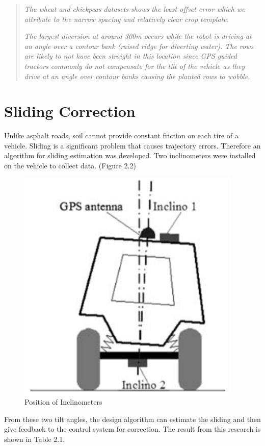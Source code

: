 \documentclass[letterpaper,12pt,oneside]{book}
\begin{document}
		\begin{quote}
			\textit{The wheat and chickpeas datasets shows the least offset error which we attribute to the narrow spacing and relatively clear crop template.}
				
			\textit{The largest diversion at around 300m occurs while the robot is driving at an angle over a contour bank (raised ridge for diverting water). The rows are likely to not have been straight in this location since GPS guided tractors commonly do not compensate for the tilt of the vehicle as they drive at an angle over contour banks causing the planted rows to wobble.}
		\end{quote}
		
		\section{Sliding Correction}
		Unlike asphalt roads, soil cannot provide constant friction on each tire of a vehicle. Sliding is a significant problem that causes trajectory errors. Therefore an algorithm for sliding estimation was developed. Two inclinometers were installed on the vehicle to collect data. (Figure 2.2) 
		\begin{figure}[ht!]
			\begin{center}
				\includegraphics[scale = 0.5]{slidingcorrection.png}
				\caption{Position of Inclinometers}
			\end{center}
		\end{figure}
		From these two tilt angles, the design algorithm can estimate the sliding and then give feedback to the control system for correction. The result from this research is shown in Table 2.1. \cite{lenain2006high}
\end{document}
